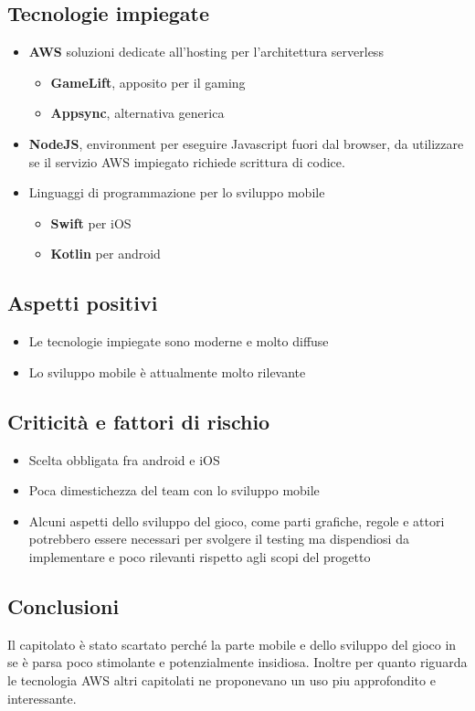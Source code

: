 \documentclass{article}
\begin{document}
\subsection{Tecnologie impiegate}
\begin{itemize}
    \item \textbf{AWS} soluzioni dedicate all'hosting per l'architettura serverless\begin{itemize}
        \item \textbf{GameLift}, apposito per il gaming
        \item \textbf{Appsync}, alternativa generica
    \end{itemize}
    \item \textbf{NodeJS}, environment per eseguire Javascript fuori dal browser, da utilizzare se il servizio AWS impiegato richiede scrittura di codice.
    \item Linguaggi di programmazione per lo sviluppo mobile \begin{itemize}
        \item \textbf{Swift} per iOS
        \item \textbf{Kotlin} per android
    \end{itemize}
\end{itemize}
\subsection{Aspetti positivi}
\begin{itemize}
    \item Le tecnologie impiegate sono moderne e molto diffuse
    \item Lo sviluppo mobile \`e attualmente molto rilevante
\end{itemize}
\subsection{Criticit\`a e fattori di rischio}
\begin{itemize}
    \item Scelta obbligata fra android e iOS
    \item Poca dimestichezza del team con lo sviluppo mobile
    \item Alcuni aspetti dello sviluppo del gioco, come parti grafiche, regole e attori potrebbero essere necessari per svolgere il testing ma dispendiosi da implementare e poco rilevanti rispetto agli scopi del progetto
\end{itemize}
\subsection{Conclusioni}
Il capitolato \`e stato scartato perch\'e la parte mobile e dello sviluppo del gioco in se \`e parsa poco stimolante e potenzialmente insidiosa. Inoltre per quanto riguarda le tecnologia AWS altri capitolati ne proponevano un uso piu approfondito e interessante.
\end{document}
